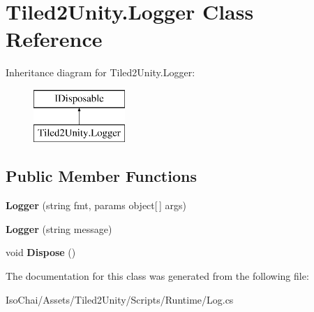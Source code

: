 \hypertarget{class_tiled2_unity_1_1_logger}{}\section{Tiled2\+Unity.\+Logger Class Reference}
\label{class_tiled2_unity_1_1_logger}
Inheritance diagram for Tiled2\+Unity.\+Logger\+:\begin{figure}[H]
\begin{center}
\leavevmode
\includegraphics[height=2.000000cm]{class_tiled2_unity_1_1_logger}
\end{center}
\end{figure}
\subsection*{Public Member Functions}
\begin{DoxyCompactItemize}
\item 
\mbox{\label{class_tiled2_unity_1_1_logger_aecf69e337c743c6e03298b97ef9bfb2d}} 
{\bfseries Logger} (string fmt, params object\mbox{[}$\,$\mbox{]} args)
\item 
\mbox{\label{class_tiled2_unity_1_1_logger_a7531e7cdca3fd985d5c72be4d41d032a}} 
{\bfseries Logger} (string message)
\item 
\mbox{\label{class_tiled2_unity_1_1_logger_ab5aa3518aaaa6bfb065bf5dc6a8a1e7e}} 
void {\bfseries Dispose} ()
\end{DoxyCompactItemize}


The documentation for this class was generated from the following file\+:\begin{DoxyCompactItemize}
\item 
Iso\+Chai/\+Assets/\+Tiled2\+Unity/\+Scripts/\+Runtime/Log.\+cs\end{DoxyCompactItemize}
